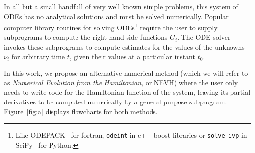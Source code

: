 \documentclass{iopart}
\begin{document}
In all but a small handfull of very well known simple problems, this system of
ODEs has no analytical solutions and must be solved numerically.  Popular
computer library routines for solving ODEs\footnote{Like ODEPACK~\cite{odepack}
  for fortran, \texttt{odeint} \cite{odeint} in c++ boost libraries or
\texttt{solve\_ivp} in SciPy~\cite{scipy} for Python.} require the user to
supply subprograms to compute the right hand side functions $G_i$.  The ODE
solver invokes these subprograms to compute estimates for the values of the
unknowns $\nu_i$ for arbitrary time $t$, given their values at a particular
instant $t_0$.

In this work, we propose an alternative numerical method (which we will refer to
as \emph{Numerical Evolution from the Hamiltonian}, or NEVH) where the user only
needs to write code for the Hamiltonian function of the system, leaving its
partial derivatives to be computed numerically by a general purpose subprogram.
Figure~\ref{fig:a} displays flowcharts for both methods.
\end{document}
